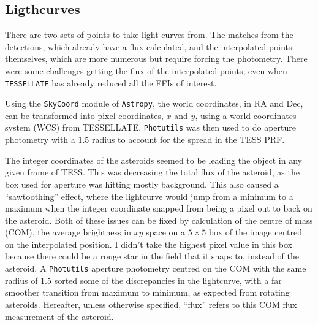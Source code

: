 \documentclass{UCreport}
\begin{document}
\subsection{Ligthcurves}\label{SubSec:Lightcurves}

There are two sets of points to take light curves from.
The matches from the detections, which already have a flux calculated, and the interpolated points themselves, which are more numerous but require forcing the photometry.
There were some challenges getting the flux of the interpolated points, even when \texttt{TESSELLATE} has already reduced all the FFIs of interest.

Using the \texttt{SkyCoord} module of \texttt{Astropy}, the world coordinates, in RA and Dec, can be transformed into pixel coordinates, $x$ and $y$, using a world coordinates system (WCS) from TESSELLATE.
\texttt{Photutils} \citep{Bradley2024} was then used to do aperture photometry with a \qty{1.5}{\px} radius to account for the spread in the TESS PRF. %

The integer coordinates of the asteroids seemed to be leading the object in any given frame of TESS. %
This was decreasing the total flux of the asteroid, as the box used for aperture  was hitting mostly background.
This also caused a ``sawtoothing'' effect, where the lightcurve would jump from a minimum to a maximum when the integer coordinate snapped from being a pixel out to back on the asteroid.
Both of these issues can be fixed by calculation of the centre of mass (COM), the average brightness in $xy$ space on a $5\times5$ \unit{\px} box of the image centred on the interpolated position.
I didn't take the highest pixel value in this box because there could be a rouge star in the field that it snaps to, instead of the asteroid.
A \texttt{Photutils} aperture photometry centred on the COM with the same radius of \qty{1.5}{\px} sorted some of the discrepancies in the lightcurve, with a far smoother transition from maximum to minimum, as expected from rotating asteroids. Hereafter, unless otherwise specified, ``flux'' refers to this COM flux measurement of the asteroid.
\end{document}
